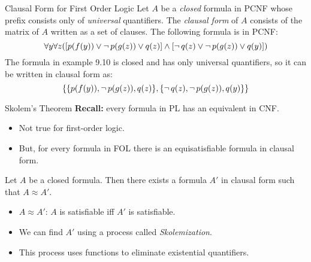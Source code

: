 \documentclass[style=sailor,size=12pt,mode=present]{powerdot}
\theoremstyle{definition}
\newenvironment{defn}[1]
  {\renewcommand\theinnerdefn{#1}\innerdefn}
  {\endinnerdefn}
\newenvironment{ex}[1]
  {\renewcommand\theinnerexample{#1}\innerexample}
  {\endinnerexample}
\newenvironment{thm}[1]
  {\renewcommand\theinnerthm{#1}\innerthm}
  {\endinnerthm}
\begin{document}
\begin{wideslide}[bm=,toc=]{Clausal Form for First Order Logic}
\begin{defn}{9.11}
Let $A$ be a \emph{closed} formula in PCNF whose prefix consists only of 
\emph{universal} quantifiers. The \emph{clausal form} of $A$ consists of
the matrix of $A$ written as a set of clauses.
\end{defn}
\begin{ex}{9.10}
The following formula is in PCNF:
\[
  \forall y \forall z([p(f(y)) \lor \mathop{\neg} p (g(z)) \lor q(z)] \land [ \mathop{\neg} q(z)
      \lor \mathop{\neg} p (g(z)) \lor q(y)])
  \]
\end{ex}
\begin{ex}{9.12}
The formula in example 9.10 is closed and has only universal quantifiers, so it
can be written in clausal form as:
\[
   \{\{p(f(y)), \mathop{\neg} p(g(z)), q(z)\}, \{ \mathop{\neg} q(z), \mathop{\neg} p (g(z)), q(y)\}\}
  \]
\end{ex}
\end{wideslide}
\begin{wideslide}[bm=,toc=]{Skolem's Theorem}
{\bf Recall:} every formula in PL has an equivalent in CNF.
\begin{itemize}
\item Not true for first-order logic.
\item But, for every formula in FOL there is an equisatisfiable formula
in clausal form.
\end{itemize}
\begin{thm}{9.13}[Skolem]
Let $A$ be a closed formula. Then there exists a formula $A'$ in clausal form
such that $A \approx A'$.
\end{thm}

\begin{itemize}
\item $A \approx A'$: $A$ is satisfiable iff $A'$ is satisfiable. 
\item We can find $A'$ using a process called \emph{Skolemization}. 
\item This process uses functions to eliminate existential quantifiers.
\end{itemize}
\end{wideslide}
\end{document}
